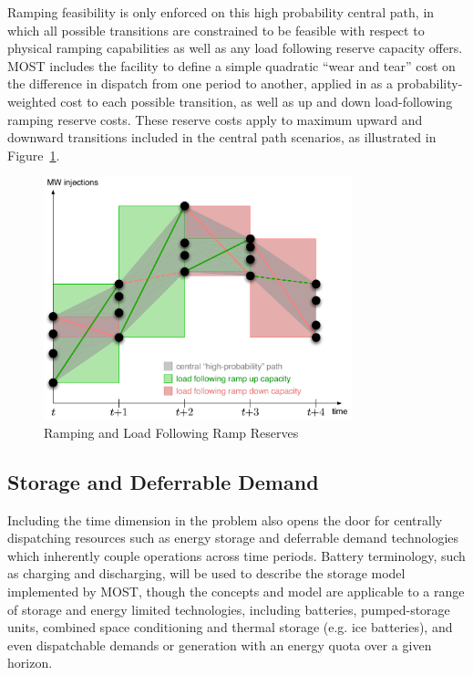\documentclass[12pt]{article}
\newcommand{\most}[0]{{MOST}}
\numberwithin{equation}{section}
\numberwithin{table}{section}
\numberwithin{figure}{section}
\begin{document}
Ramping feasibility is only enforced on this high probability central path, in which all possible transitions are constrained to be feasible with respect to physical ramping capabilities as well as any load following reserve capacity offers. \most{} includes the facility to define a simple quadratic ``wear and tear'' cost on the difference in dispatch from one period to another, applied in as a probability-weighted cost to each possible transition, as well as up and down load-following ramping reserve costs. These reserve costs apply to maximum upward and downward transitions included in the central path scenarios, as illustrated in Figure~\ref{fig:ramping}.

\begin{figure}[hbt]
  \centering
  \includegraphics[width=0.8\textwidth]{./figures/ramping-9}
  \caption{Ramping and Load Following Ramp Reserves}
  \label{fig:ramping}
\end{figure}

\subsection{Storage and Deferrable Demand}

Including the time dimension in the problem also opens the door for centrally dispatching resources such as energy storage and deferrable demand technologies which inherently couple operations across time periods. Battery terminology, such as charging and discharging, will be used to describe the storage model implemented by \most{}, though the concepts and model are applicable to a range of storage and energy limited technologies, including batteries, pumped-storage units, combined space conditioning and thermal storage (e.g. ice batteries), and even dispatchable demands or generation with an energy quota over a given horizon.
\end{document}

